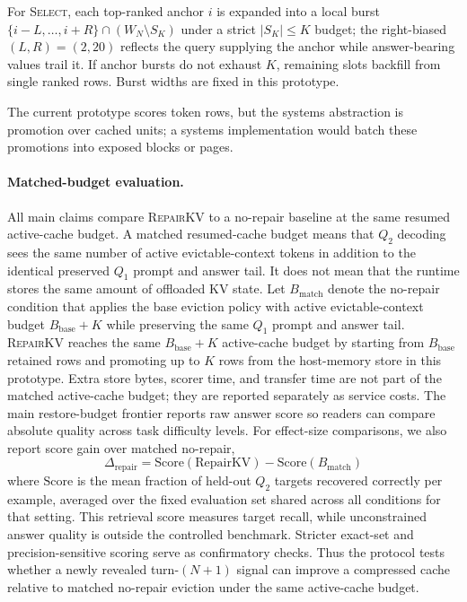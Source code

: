 \documentclass{article}
\newcommand{\repairkv}{\textsc{RepairKV}}
\newcommand{\bbase}{\ensuremath{B_{\mathrm{base}}}}
\newcommand{\bmatch}{\ensuremath{B_{\mathrm{match}}}}
\begin{document}
For \textsc{Select}, each top-ranked anchor $i$ is
expanded into a local burst $\{i{-}L,\dots,i{+}R\} \cap (W_N \setminus
S_K)$ under a strict $|S_K| \le K$ budget; the right-biased
$(L, R) = (2, 20)$ reflects the query supplying the anchor while
answer-bearing values trail it. If anchor bursts do not exhaust $K$,
remaining slots backfill from single ranked rows. Burst widths are
fixed in this prototype.

The current prototype scores token rows, but the systems abstraction is
promotion over cached units; a systems implementation
would batch these promotions into exposed blocks or pages.

\paragraph{Matched-budget evaluation.}
All main claims compare \repairkv{} to a no-repair baseline at the same
resumed active-cache budget.
A matched resumed-cache budget means that $Q_2$ decoding sees
the same number of active evictable-context tokens in addition to the
identical preserved $Q_1$ prompt and answer tail.
It does not mean that the runtime stores the same amount of offloaded KV
state.
Let $\bmatch$ denote the no-repair condition that applies the base
eviction policy with active evictable-context budget $\bbase + K$ while preserving the
same $Q_1$ prompt and answer tail.
\repairkv{} reaches the same $\bbase+K$ active-cache budget by
starting from $\bbase$ retained rows and promoting up to $K$ rows from the
host-memory store in this prototype.
Extra store bytes, scorer time, and transfer time are not part of the matched
active-cache budget; they are reported separately as service costs.
The main restore-budget frontier reports raw answer score so readers can
compare absolute quality across task difficulty levels.
For effect-size comparisons, we also report score gain over matched
no-repair,
\begin{equation}
  \Delta_{\mathrm{repair}} =
  \mathrm{Score}(\mathrm{RepairKV}) - \mathrm{Score}(B_{\mathrm{match}})
\end{equation}
where $\mathrm{Score}$ is the mean fraction of held-out $Q_2$ targets
recovered correctly per example, averaged over the fixed evaluation set
shared across all conditions for that setting.
This retrieval score measures target recall, while unconstrained answer
quality is outside the controlled benchmark.
Stricter exact-set and precision-sensitive scoring serve as confirmatory
checks.
Thus the protocol tests whether a newly revealed turn-$(N{+}1)$
signal can improve a compressed cache relative to matched
no-repair eviction under the same active-cache budget.
\end{document}
